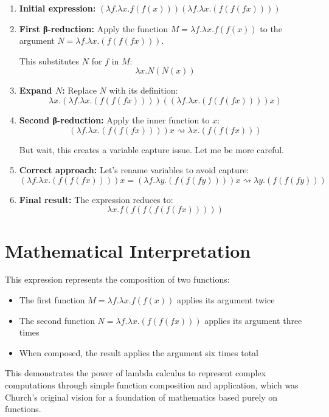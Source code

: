 \documentclass{article}
\theoremstyle{plain}
\theoremstyle{definition}
\theoremstyle{remark}
\begin{document}
\begin{enumerate}
    \item \textbf{Initial expression:} $(\lambda f.\lambda x.f(f(x))) (\lambda f.\lambda x.(f(f(f x))))$
    
    \item \textbf{First β-reduction:} Apply the function $M = \lambda f.\lambda x.f(f(x))$ to the argument $N = \lambda f.\lambda x.(f(f(f x)))$.
    
    This substitutes $N$ for $f$ in $M$:
    $$\lambda x. N(N(x))$$
    
    \item \textbf{Expand $N$:} Replace $N$ with its definition:
    $$\lambda x. (\lambda f.\lambda x.(f(f(f x)))) ((\lambda f.\lambda x.(f(f(f x)))) x)$$
    
    \item \textbf{Second β-reduction:} Apply the inner function to $x$:
    $$(\lambda f.\lambda x.(f(f(f x)))) x \rightsquigarrow \lambda x.(f(f(f x)))$$
    
    But wait, this creates a variable capture issue. Let me be more careful.
    
    \item \textbf{Correct approach:} Let's rename variables to avoid capture:
    $$(\lambda f.\lambda x.(f(f(f x)))) x = (\lambda f.\lambda y.(f(f(f y)))) x \rightsquigarrow \lambda y.(f(f(f y)))$$
    
    \item \textbf{Final result:} The expression reduces to:
    $$\lambda x. f(f(f(f(f(f x)))))$$
\end{enumerate}

\section{Mathematical Interpretation}

This expression represents the composition of two functions:
\begin{itemize}
    \item The first function $M = \lambda f.\lambda x.f(f(x))$ applies its argument twice
    \item The second function $N = \lambda f.\lambda x.(f(f(f x)))$ applies its argument three times
    \item When composed, the result applies the argument six times total
\end{itemize}

This demonstrates the power of lambda calculus to represent complex computations through simple function composition and application, which was Church's original vision for a foundation of mathematics based purely on functions.
\end{document}
